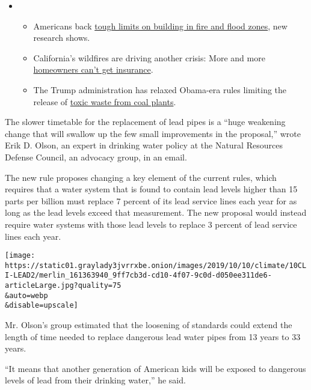 \begin{itemize}
\item
  \begin{itemize}
  \tightlist
  \item
    Americans back
    \href{https://www.nytimes3xbfgragh.onion/2020/09/04/climate/flood-fire-building-restrictions.html?action=click\&pgtype=Article\&state=default\&region=MAIN_CONTENT_1\&context=storylines_keepup}{tough
    limits on building in fire and flood zones}, new research shows.
  \item
    California's wildfires are driving another crisis: More and more
    \href{https://www.nytimes3xbfgragh.onion/2020/09/02/climate/wildfires-insurance.html?action=click\&pgtype=Article\&state=default\&region=MAIN_CONTENT_1\&context=storylines_keepup}{homeowners
    can't get insurance}.
  \item
    The Trump administration has relaxed Obama-era rules limiting the
    release of
    \href{https://www.nytimes3xbfgragh.onion/2020/08/31/climate/trump-coal-plants.html?action=click\&pgtype=Article\&state=default\&region=MAIN_CONTENT_1\&context=storylines_keepup}{toxic
    waste from coal plants}.
  \end{itemize}
\end{itemize}

The slower timetable for the replacement of lead pipes is a ``huge
weakening change that will swallow up the few small improvements in the
proposal,'' wrote Erik D. Olson, an expert in drinking water policy at
the Natural Resources Defense Council, an advocacy group, in an email.

The new rule proposes changing a key element of the current rules, which
requires that a water system that is found to contain lead levels higher
than 15 parts per billion must replace 7 percent of its lead service
lines each year for as long as the lead levels exceed that measurement.
The new proposal would instead require water systems with those lead
levels to replace 3 percent of lead service lines each year.

\texttt{[image: https://static01.graylady3jvrrxbe.onion/images/2019/10/10/climate/10CLI-LEAD2/merlin\_161363940\_9ff7cb3d-cd10-4f07-9c0d-d050ee311de6-articleLarge.jpg?quality=75\\\&auto=webp\\\&disable=upscale]}

Mr. Olson's group estimated that the loosening of standards could extend
the length of time needed to replace dangerous lead water pipes from 13
years to 33 years.

``It means that another generation of American kids will be exposed to
dangerous levels of lead from their drinking water,'' he said.

